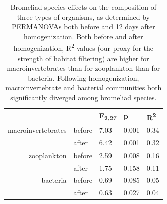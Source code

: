 \begin{table}[h] 
\begin{tabular}[c]{r l l l l} 

\toprule
                   &         & F\textsubscript{2,27} & p & R\textsuperscript{2} \\
\midrule
macroinvertebrates & before  & 7.03 & 0.001 & 0.34 \\
                   & after   & 6.42 & 0.001 & 0.32 \\
zooplankton        & before  & 2.59 & 0.008 & 0.16 \\
                   & after   & 1.75 & 0.158 & 0.11 \\
bacteria           & before  & 0.69 & 0.085 & 0.05 \\
                   & after   & 0.63 & 0.027 & 0.04 \\
\bottomrule
\end{tabular}
\caption[Bromeliad species effects on the composition of three groups of organisms]{Bromeliad species effects on the composition of three types of
organisms, as determined by PERMANOVAs both before and 12 days after
homogenization. Both before and after homogenization,
R\textsuperscript{2} values (our proxy for the strength of habitat
filtering) are higher for macroinvertebrates than for zooplankton than
for bacteria. Following homogenization, macroinvertebrate and bacterial
communities both significantly diverged among bromeliad species.} 
\label{tab:rsquares} 
\end{table} 

